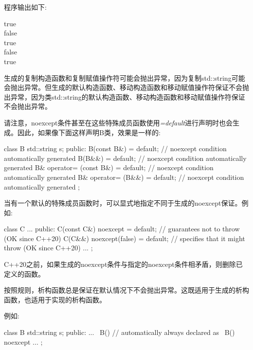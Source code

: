 程序输出如下:\par

\begin{myOutput}
true \\
false \\
true \\
false \\
true
\end{myOutput}

生成的复制构造函数和复制赋值操作符可能会抛出异常，因为复制std::string可能会抛出异常。但生成的默认构造函数、移动构造函数和移动赋值操作符保证不会抛出异常，因为类std::string的默认构造函数、移动构造函数和移动赋值操作符保证不会抛出异常。\par

请注意，noexcept条件甚至在这些特殊成员函数使用\textit{=default}进行声明时也会生成。因此，如果像下面这样声明B类，效果是一样的:\par

\begin{codebox}[cpp]
class B
{
  std::string s;
public:
  B(const B&) = default; // noexcept condition automatically generated
  B(B&&) = default; // noexcept condition automatically generated
  B& operator= (const B&) = default; // noexcept condition automatically generated
  B& operator= (B&&) = default; // noexcept condition automatically generated
};
\end{codebox}

当有一个默认的特殊成员函数时，可以显式地指定不同于生成的noexcept保证。例如:\par

\begin{codebox}[cpp]
class C
{
  ...
public:
  C(const C&) noexcept = default; // guarantees not to throw (OK since C++20)
  C(C&&) noexcept(false) = default; // specifies that it might throw (OK since C++20)
  ...
};
\end{codebox}

C++20之前，如果生成的noexcept条件与指定的noexcept条件相矛盾，则删除已定义的函数。\par


按照规则，析构函数总是保证在默认情况下不会抛出异常。这既适用于生成的析构函数，也适用于实现的析构函数。\par

例如:\par

\begin{codebox}[cpp]
class B
{
  std::string s;
  public:
  ...
  ~B() { // automatically always declared as ~B() noexcept
    ...
  }
};
\end{codebox}

